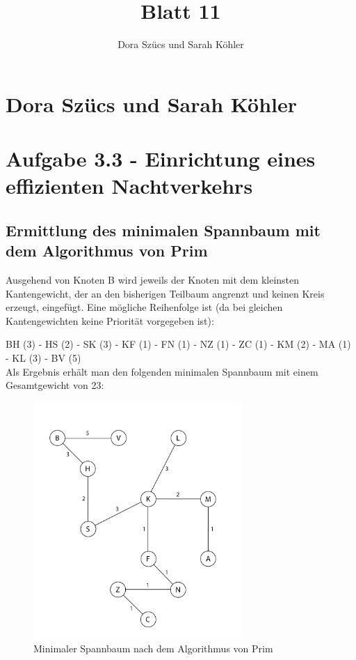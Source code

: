 \documentclass[12pt]{amsart}
\title{Blatt 11}
\author{Dora Szücs und Sarah Köhler}
\begin{document}
\section*{Dora Szücs und Sarah Köhler}
\section*{Aufgabe 3.3 - Einrichtung eines effizienten Nachtverkehrs}

\subsection*{Ermittlung des minimalen Spannbaum mit dem Algorithmus von Prim}

Ausgehend von Knoten B wird jeweils der Knoten mit dem kleinsten Kantengewicht, der an den bisherigen Teilbaum angrenzt und keinen Kreis erzeugt, eingefügt.
Eine mögliche Reihenfolge ist (da bei gleichen Kantengewichten keine Priorität vorgegeben ist):

BH (3) - HS (2) - SK (3) - KF (1) - FN (1) - NZ (1) - ZC (1) - KM (2) - MA (1) - KL (3) - BV (5) \\

Als Ergebnis erhält man den folgenden minimalen Spannbaum mit einem Gesamtgewicht von 23:
\begin{figure}[h] %
   \centering
   \includegraphics[width=8cm]{prim.png} 
   \caption{Minimaler Spannbaum nach dem Algorithmus von Prim}
   \label{fig:example}
\end{figure}
\end{document}
